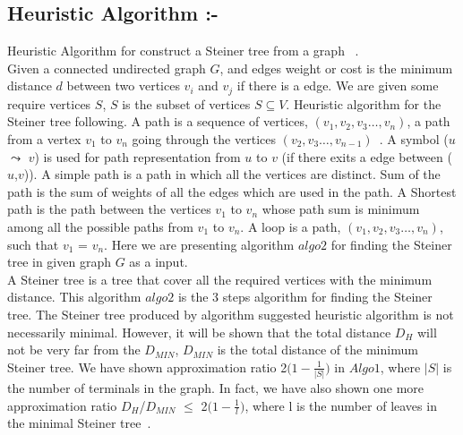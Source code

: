 \subsection{Heuristic Algorithm :-}
Heuristic Algorithm for construct a Steiner tree from a graph ~\cite{markowsky}.\\
Given a connected undirected graph $G$, and edges weight or cost is the minimum distance $d$ between two vertices $v_i$ and $v_j$ if there is a edge. We are given some require vertices $S$, $S$ is the subset of vertices $S \subseteq V$. Heuristic algorithm for the Steiner tree following. A path is a sequence of vertices, $(v_1,v_2,v_3 \dots, v_n)$, a path from a vertex $v_1$ to $v_n$ going through the vertices $(v_2,v_3 \dots, v_{n-1})$~\cite{karger}. A symbol ($u$ $\leadsto$ $v$) is used for path representation from $u$ to $v$ (if there exits a edge between ($u$,$v$)). A simple path is a path in which all the vertices are distinct. Sum of the path is the sum of weights of all the edges which are used in the path. A Shortest path is the path between the vertices $v_1$ to $v_n$ whose path sum is minimum among all the possible paths from $v_1$ to $v_n$. A loop is a path, $(v_1,v_2,v_3 \dots, v_n)$, such that $v_1$ = $v_n$. Here we are presenting algorithm $algo2$ for finding the Steiner tree in given graph $G$ as a input.\\ A Steiner tree is a tree that cover all the required vertices with the minimum distance. This algorithm $algo2$ is the 3 steps algorithm for finding the Steiner tree. The Steiner tree produced by algorithm suggested heuristic algorithm is not necessarily minimal. However, it will be shown that the total distance $D_H$ will not be very far from the $D_{MIN}$, $D_{MIN}$ is the total distance of the minimum Steiner tree. We have shown approximation ratio 2$\Big(1-\frac{1}{|S|}\Big)$ in $Algo1$, where $|S|$ is the number of terminals in the graph. In fact, we have also shown one more approximation ratio $D_H$/$D_{MIN}$ $\leq$ 2$\Big(1 - \frac{1}{l} \Big)$, where l is the  number of leaves in the minimal Steiner tree~\cite{markowsky}.



